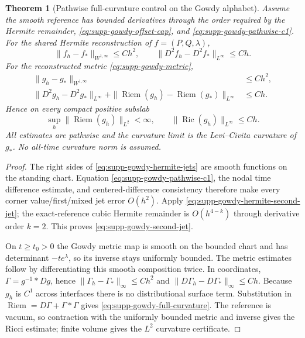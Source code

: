 \documentclass[11pt]{article}
\newtheorem{theorem}{Theorem}[section]
\theoremstyle{definition}
\theoremstyle{remark}
\begin{document}
\begin{theorem}[Pathwise full-curvature control on the Gowdy alphabet]
\label{thm:supp-gowdy-full-curvature}
Assume the smooth reference has bounded derivatives through the order required
by the Hermite remainder, \eqref{eq:supp-gowdy-offset-cap}, and
\eqref{eq:supp-gowdy-pathwise-c1}.  For the shared Hermite reconstruction of
$f=(P,Q,\lambda)$,
\begin{equation}
 \boxed{
 \|f_h-f_*\|_{W^{1,\infty}}\le Ch^2,
 \qquad
 \|D^2f_h-D^2f_*\|_{L^\infty}\le Ch.}
 \label{eq:supp-gowdy-second-jet}
\end{equation}
For the reconstructed metric \eqref{eq:supp-gowdy-metric},
\begin{align}
 \|g_h-g_*\|_{W^{1,\infty}}&\le Ch^2,\nonumber\\
 \|D^2g_h-D^2g_*\|_{L^\infty}
 +\|\operatorname{Riem}(g_h)-\operatorname{Riem}(g_*)\|_{L^\infty}
 &\le Ch.
 \label{eq:supp-gowdy-full-curvature}
\end{align}
Hence on every compact positive subslab
\begin{equation}
 \boxed{\sup_h\|\operatorname{Riem}(g_h)\|_{L^2}<\infty,
 \qquad \|\operatorname{Ric}(g_h)\|_{L^\infty}\le Ch.}
 \label{eq:supp-gowdy-curvature-certificate}
\end{equation}
All estimates are pathwise and the curvature limit is the Levi--Civita
curvature of $g_*$.  No all-time curvature norm is assumed.
\end{theorem}
\begin{proof}
The right sides of \eqref{eq:supp-gowdy-hermite-jets} are smooth functions on
the standing chart.  Equation \eqref{eq:supp-gowdy-pathwise-c1}, the nodal time
difference estimate, and centered-difference consistency therefore make every
corner value/first/mixed jet error $O(h^2)$.  Apply
\eqref{eq:supp-gowdy-hermite-second-jet}; the exact-reference cubic Hermite
remainder is $O(h^{4-k})$ through derivative order $k=2$.  This proves
\eqref{eq:supp-gowdy-second-jet}.

On $t\ge t_0>0$ the Gowdy metric map is smooth on the bounded chart and has
determinant $-te^\lambda$, so its inverse stays uniformly bounded.  The metric
estimates follow by differentiating this smooth composition twice.  In
coordinates, $\Gamma=g^{-1}*Dg$, hence
$\|\Gamma_h-\Gamma_*\|_\infty\le Ch^2$ and
$\|D\Gamma_h-D\Gamma_*\|_\infty\le Ch$.  Because $g_h$ is $C^1$ across
interfaces there is no distributional surface term.  Substitution in
$\operatorname{Riem}=D\Gamma+\Gamma*\Gamma$ gives
\eqref{eq:supp-gowdy-full-curvature}.  The reference is vacuum, so contraction
with the uniformly bounded metric and inverse gives the Ricci estimate; finite
volume gives the $L^2$ curvature certificate.
\end{proof}
\end{document}
